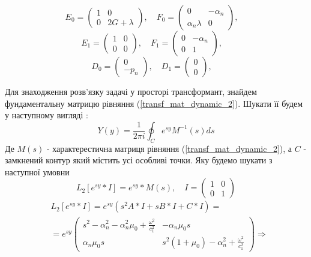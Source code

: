 \begin{equation*}
    E_0 = \begin{pmatrix}
        1 & 0 \\
        0 & 2G + \lambda
    \end{pmatrix}, \quad
    F_0 = \begin{pmatrix}
        0 & -\alpha_n \\
        \alpha_n \lambda & 0
    \end{pmatrix}, \quad
\end{equation*}
\begin{equation*}
    E_1 = \begin{pmatrix}
        1 & 0 \\
        0 & 0
    \end{pmatrix}, \quad
    F_1 = \begin{pmatrix}
        0 & -\alpha_n \\
        0 & 1
    \end{pmatrix}, \quad
\end{equation*}
\begin{equation*}
    D_0 = \begin{pmatrix}
        0 \\
        -p_n
    \end{pmatrix}, \quad
    D_1 = \begin{pmatrix}
        0 \\
        0
    \end{pmatrix}, \quad
\end{equation*}

Для знаходження розв'язку задачі у просторі трансформант, знайдем фундаментальну матрицю рівняння (\ref{transf_mat_dynamic_2}).
Шукати її будем у наступному вигляді \cite{gantmaher}:
\begin{equation}
    Y(y) = \frac{1}{2\pi i} \oint_C e^{sy} M^{-1}(s)ds
\end{equation}
Де $M(s)$ - характерестична матриця рівняння (\ref{transf_mat_dynamic_2}), а $C$ - замкнений контур який містить усі особливі точки. Яку будемо шукати з наступної умовни
\begin{equation}
    L_2\left[ e^{sy}*I \right] = e^{sy} * M(s), \quad I = \begin{pmatrix} 1 & 0 \\ 0 & 1 \end{pmatrix}
\end{equation}
\begin{align*}
    &L_2\left[ e^{sy}*I \right] = e^{sy} \left( s^2A * I + s B*I + C*I \right) = \\
    &=e^{sy} \begin{pmatrix}
        s^2 - \alpha_n^2 - \alpha_n^2\mu_0 + \frac{\omega^2}{c_1^2} & -\alpha_n \mu_0 s \\
        \alpha_n \mu_0 s & s^2 (1 + \mu_0) -\alpha_n^2 + \frac{\omega^2}{c_1^2}
     \end{pmatrix} \Rightarrow
\end{align*}

